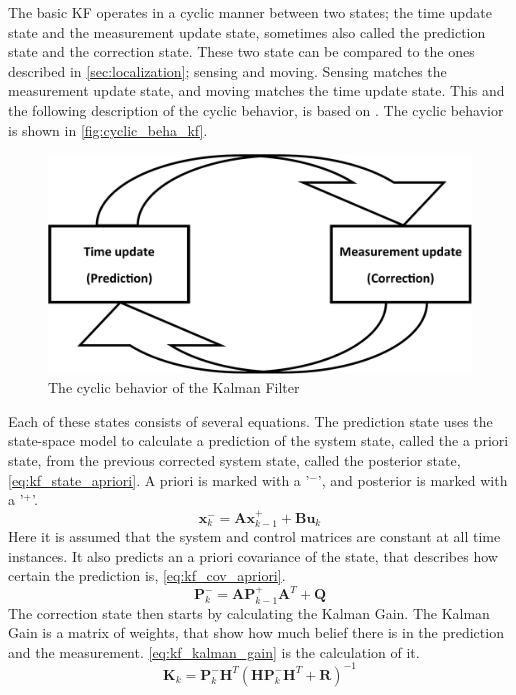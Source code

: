 \documentclass[Main]{subfiles}
\begin{document}
The basic KF operates in a cyclic manner between two states; the time update state and the measurement update state, sometimes also called the prediction state and the correction state. 
These two state can be compared to the ones described in \autoref{sec:localization}; sensing and moving.
Sensing matches the measurement update state, and moving matches the time update state.
This and the following description of the cyclic behavior, is based on \cite{Simon2006}.
The cyclic behavior is shown in \autoref{fig:cyclic_beha_kf}.
\begin{figure}[H]
	\centering
	\includegraphics[width=0.5\linewidth]{./Figures/kf_states.png}
	\caption{The cyclic behavior of the Kalman Filter}
	\label{fig:cyclic_beha_kf}
\end{figure}\noindent
Each of these states consists of several equations. 
The prediction state uses the state-space model to calculate a prediction of the system state, called the a priori state, from the previous corrected system state, called the posterior state, \autoref{eq:kf_state_apriori}.
A priori is marked with a '$^-$', and posterior is marked with a '$^+$'.
\begin{equation}
\label{eq:kf_state_apriori}
\mathbf{x}_k^-=\mathbf{A} \mathbf{x}_{k-1}^+ + \mathbf{B} \mathbf{u}_k
\end{equation}
Here it is assumed that the system and control matrices are constant at all time instances.
It also predicts an a priori covariance of the state, that describes how certain the prediction is, \autoref{eq:kf_cov_apriori}.
\begin{equation}
\label{eq:kf_cov_apriori}
\mathbf{P}_k^-=\mathbf{A} \mathbf{P}_{k-1}^+ \mathbf{A}^T+\mathbf{Q}
\end{equation}
The correction state then starts by calculating the Kalman Gain. 
The Kalman Gain is a matrix of weights, that show how much belief there is in the prediction and the measurement. \autoref{eq:kf_kalman_gain} is the calculation of it.
\begin{equation}
\label{eq:kf_kalman_gain}
\mathbf{K}_k = \mathbf{P}_k^- \mathbf{H}^T (\mathbf{H} \mathbf{P}_k^- \mathbf{H}^T + \mathbf{R})^{-1}
\end{equation}
\end{document}
